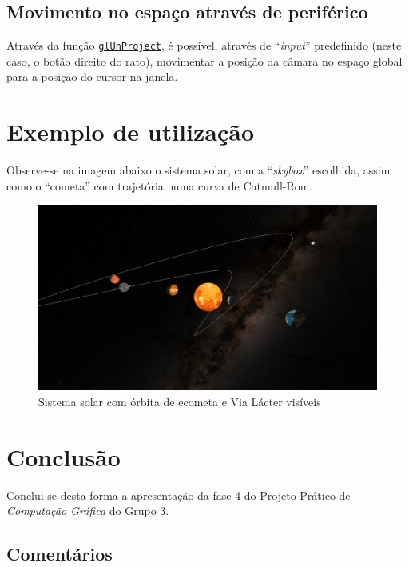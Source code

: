 \documentclass[11pt,a4paper]{report}%
\def\cg{\emph{Computação Gráfica}\xspace}
\begin{document}
\section{Movimento no espaço através de periférico}

Através da função \href{https://www.khronos.org/registry/OpenGL-Refpages/gl2.1/xhtml/gluUnProject.xml}{\texttt{glUnProject}},
é possível, através de ``\textit{input}'' predefinido (neste caso, o botão direito do rato), movimentar a posição
da câmara no espaço global para a posição do cursor na janela.

\chapter{Exemplo de utilização} \label{chap:exemps} %

Observe-se na imagem abaixo o sistema solar, com a ``\textit{skybox}'' escolhida, assim como
o ``cometa'' com trajetória numa curva de Catmull-Rom.

\begin{figure}[H]
  \centering
  \includegraphics[scale=0.4]{exemplo.png}
  \caption{Sistema solar com órbita de ecometa e Via Lácter visíveis}
  \label{fig:exemplo}
\end{figure}

\chapter{Conclusão} \label{concl}

Conclui-se desta forma a apresentação da fase 4 do Projeto Prático de \cg do Grupo 3.

\section{Comentários}
\end{document}

